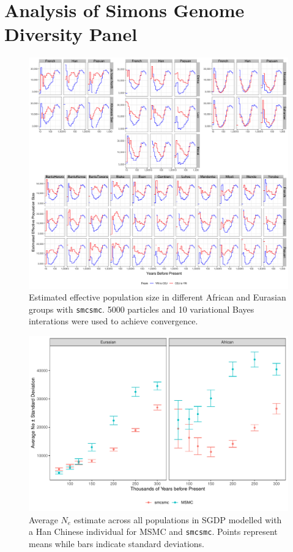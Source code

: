 \documentclass{article}
\begin{document}
\section{Analysis of Simons Genome Diversity Panel}

\begin{figure}
	\centering
	\includegraphics[width=\linewidth]{../plot/sgdp_ne.png}
	\caption{Estimated effective population size in different African and Eurasian groups with {\tt smcsmc}. 5000 particles and 10 variational Bayes interations were used to achieve convergence.}	
	\label{sgdp_ne}
\end{figure}

\begin{figure}
	\centering
	\includegraphics[width=\linewidth]{../plot/ne/average_ne_by_method.pdf}
	\caption{Average $N_e$ estimate across all populations in SGDP modelled with a Han Chinese individual for MSMC and {\tt smcsmc}. Points represent means while bars indicate standard deviations.}
	\label{averages}
\end{figure}
\end{document}
